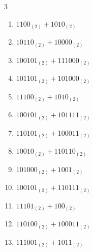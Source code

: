 \begin{multicols}{3}
\begin{enumerate}

\columnbreak %

  \item $1100_{(2)} + 1010_{(2)}$


  \item $10110_{(2)} + 10000_{(2)}$


  \item $100101_{(2)} + 111000_{(2)}$


  \item $101101_{(2)} + 101000_{(2)}$


  \item $11100_{(2)} + 1010_{(2)}$


  \item $100101_{(2)} + 101111_{(2)}$


  \item $110101_{(2)} + 100011_{(2)}$


  \item $10010_{(2)} + 110110_{(2)}$


  \item $101000_{(2)} + 1001_{(2)}$


  \item $100101_{(2)} + 110111_{(2)}$


\columnbreak %

  \item $11101_{(2)} + 100_{(2)}$


  \item $110100_{(2)} + 100011_{(2)}$


  \item $111001_{(2)} + 1011_{(2)}$


\end{enumerate}
\end{multicols}
